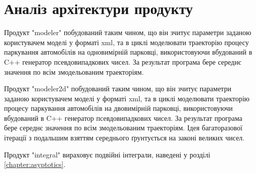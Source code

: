 \section{Аналіз архітектури продукту}

Продукт "modeler" побудований таким чином, що він зчитує параметри заданою користувачем моделі у форматі xml, та в циклі моделювати траекторію процесу паркування автомобілів на одновимірній парковці, використовуючи вбудований в C++ генератор псевдовипадкових чисел. За результат програма бере середнє значення по всім змодельованим траекторіям.

Продукт "modeler2d" побудований таким чином, що він зчитує параметри заданою користувачем моделі у форматі xml, та в циклі моделювати траекторію процесу паркування автомобілів на двовимірній парковці, використовуючи вбудований в C++ генератор псевдовипадкових чисел. За результат програма бере середнє значення по всім змодельованим траекторіям. Ідея багаторазової ітерації з подальшим взяттям середнього ґрунтується на законі великих чисел.

Продукт "integral" вираховує подвійні інтеграли, наведені у розділі \ref{chapter:asyptotics}.
